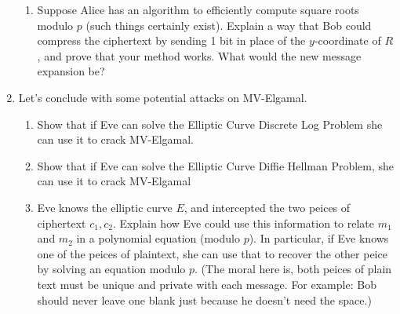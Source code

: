 \documentclass[11pt]{article}
\begin{document}
\begin{enumerate}
{\begin{enumerate}
{    What is the message expansion of MV-Elgamal?
    }
    \item{
    Suppose Alice has an algorithm to efficiently compute square roots modulo $p$ (such things certainly exist).  Explain a way that Bob could compress the ciphertext by sending 1 bit in place of the $y$-coordinate of $R$, and prove that your method works.  What would the new message expansion be?
    }
  \end{enumerate}
  }
  \item{
  Let's conclude with some potential attacks on MV-Elgamal.
  \begin{enumerate}
    \item{
    Show that if Eve can solve the Elliptic Curve Discrete Log Problem she can use it to crack MV-Elgamal.
    }
    \item{
    Show that if Eve can solve the Elliptic Curve Diffie Hellman Problem, she can use it to crack MV-Elgamal}
    \item{
    Eve knows the elliptic curve $E$, and intercepted the two peices of ciphertext $c_1,c_2$.  Explain how Eve could use this information to relate $m_1$ and $m_2$ in a polynomial equation (modulo $p$).  In particular, if Eve knows one of the peices of plaintext, she can use that to recover the other peice by solving an equation modulo $p$.  (The moral here is, both peices of plain text must be unique and private with each message.  For example: Bob should never leave one blank just because he doesn't need the space.)
    }
  \end{enumerate}
  }
\end{enumerate}
\end{document}
